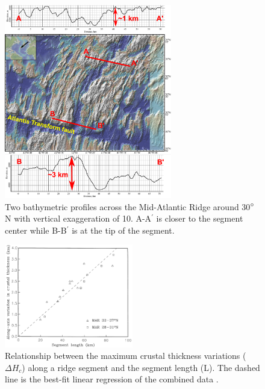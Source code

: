 \begin{figure}[h]
 \centering
  \includegraphics[width=0.65\textwidth]{./Figures/fig_Intro1_2_30N_MAR_offAxisMorphologies.eps}
 \caption[Two bathymetric profiles across the Mid-Atlantic Ridge around 30$\degree$N with vertical exaggeration of 10.]{Two bathymetric profiles across the Mid-Atlantic Ridge around 30$\degree$N with vertical exaggeration of 10. A-A$^{\prime}$ is closer to the segment center while B-B$^{\prime}$ is at the tip of the segment.}
  \label{fig_Intro2_1}
\end{figure}

\begin{figure}[h]
 \centering
  \includegraphics[width=0.5\textwidth]{./Figures/fig_Intro3_1.png}
 \caption[Relationship between the maximum crustal thickness variations ($\Delta H_{c}$) along a ridge segment and the segment length (L).]{Relationship between the maximum crustal thickness variations ($\Delta H_{c}$) along a ridge segment and the segment length (L). The dashed line is the best-fit linear regression of the combined data \citep{Chen1999}.}
 \label{fig_Intro3_1}
\end{figure}

